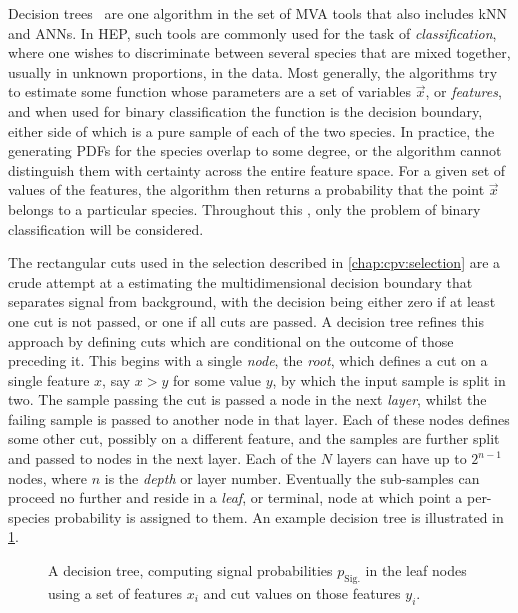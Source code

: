 Decision trees~\cite{breiman1984classification,Louppe:14077502} are one 
algorithm in the set of \acl{MVA} tools that also includes \acl{kNN} and 
\aclp{ANN}.
In \acl{HEP}, such tools are commonly used for the task of 
\emph{classification}, where one wishes to discriminate between several species 
that are mixed together, usually in unknown proportions, in the data.
Most generally, the algorithms try to estimate some function whose parameters 
are a set of variables $\vec{x}$, or \emph{features}, and when used for binary 
classification the function is the decision boundary, either side of which is a 
pure sample of each of the two species.
In practice, the generating \acp{PDF} for the species overlap to some degree, 
or the algorithm cannot distinguish them with certainty across the entire 
feature space.
For a given set of values of the features, the algorithm then returns a 
probability that the point $\vec{x}$ belongs to a particular species.
Throughout this , only the 
problem of binary classification will be considered.

The rectangular cuts used in the selection described in 
\cref{chap:cpv:selection} are a crude attempt at a estimating the 
multidimensional decision boundary that separates signal from background, with 
the decision being either zero if at least one cut is not passed, or one if all 
cuts are passed.
A decision tree refines this approach by defining cuts which are conditional on 
the outcome of those preceding it.
This begins with a single \emph{node}, the \emph{root}, which defines a cut on 
a single feature $x$, say $x > y$ for some value $y$, by which the input sample 
is split in two.
The sample passing the cut is passed a node in the next \emph{layer}, whilst 
the failing sample is passed to another node in that layer.
Each of these nodes defines some other cut, possibly on a different feature, 
and the samples are further split and passed to nodes in the next layer.
Each of the $N$ layers can have up to $2^{n - 1}$ nodes, where $n$ is the 
\emph{depth} or layer number.
Eventually the sub-samples can proceed no further and reside in a \emph{leaf}, 
or terminal, node at which point a per-species probability is assigned to them.
An example decision tree is illustrated in 
\cref{fig:cpv:kinematic_weighting:decision_tree}.

\begin{figure}
  \centering
  
  \caption{%
    A decision tree, computing signal probabilities $p_{\text{Sig.}}$ in the 
    leaf nodes using a set of features $x_{i}$ and cut values on those features 
    $y_{i}$.
  }
  \label{fig:cpv:kinematic_weighting:decision_tree}
\end{figure}

